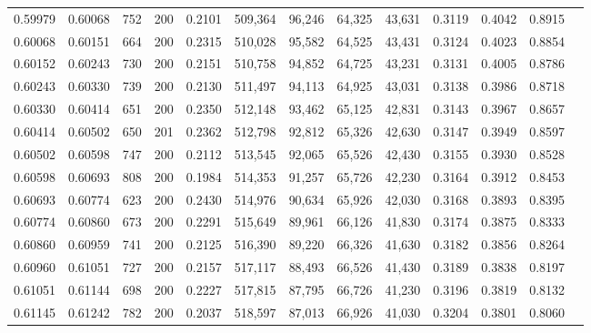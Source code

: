 \begin{tabular}{rrrrrrrrrrrrr}
0.59979 & 0.60068 &   752 & 200 &                                     0.2101 & 509,364 &  96,246 &  64,325 &  43,631 & 0.3119 & 0.4042 & 0.8915 \\
0.60068 & 0.60151 &   664 & 200 &                                     0.2315 & 510,028 &  95,582 &  64,525 &  43,431 & 0.3124 & 0.4023 & 0.8854 \\
0.60152 & 0.60243 &   730 & 200 &                                     0.2151 & 510,758 &  94,852 &  64,725 &  43,231 & 0.3131 & 0.4005 & 0.8786 \\
0.60243 & 0.60330 &   739 & 200 &                                     0.2130 & 511,497 &  94,113 &  64,925 &  43,031 & 0.3138 & 0.3986 & 0.8718 \\
0.60330 & 0.60414 &   651 & 200 &                                     0.2350 & 512,148 &  93,462 &  65,125 &  42,831 & 0.3143 & 0.3967 & 0.8657 \\
0.60414 & 0.60502 &   650 & 201 &                                     0.2362 & 512,798 &  92,812 &  65,326 &  42,630 & 0.3147 & 0.3949 & 0.8597 \\
0.60502 & 0.60598 &   747 & 200 &                                     0.2112 & 513,545 &  92,065 &  65,526 &  42,430 & 0.3155 & 0.3930 & 0.8528 \\
0.60598 & 0.60693 &   808 & 200 &                                     0.1984 & 514,353 &  91,257 &  65,726 &  42,230 & 0.3164 & 0.3912 & 0.8453 \\
0.60693 & 0.60774 &   623 & 200 &                                     0.2430 & 514,976 &  90,634 &  65,926 &  42,030 & 0.3168 & 0.3893 & 0.8395 \\
0.60774 & 0.60860 &   673 & 200 &                                     0.2291 & 515,649 &  89,961 &  66,126 &  41,830 & 0.3174 & 0.3875 & 0.8333 \\
0.60860 & 0.60959 &   741 & 200 &                                     0.2125 & 516,390 &  89,220 &  66,326 &  41,630 & 0.3182 & 0.3856 & 0.8264 \\
0.60960 & 0.61051 &   727 & 200 &                                     0.2157 & 517,117 &  88,493 &  66,526 &  41,430 & 0.3189 & 0.3838 & 0.8197 \\
0.61051 & 0.61144 &   698 & 200 &                                     0.2227 & 517,815 &  87,795 &  66,726 &  41,230 & 0.3196 & 0.3819 & 0.8132 \\
0.61145 & 0.61242 &   782 & 200 &                                     0.2037 & 518,597 &  87,013 &  66,926 &  41,030 & 0.3204 & 0.3801 & 0.8060 \\

\end{tabular}
